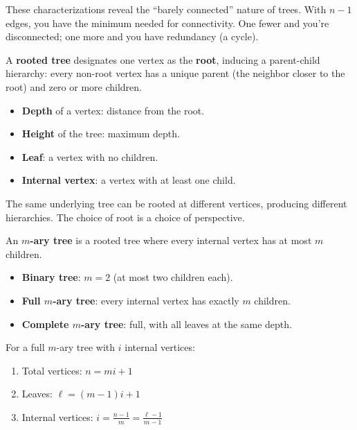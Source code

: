 These characterizations reveal the ``barely connected'' nature of trees. With $n-1$ edges, you have the minimum needed for connectivity. One fewer and you're disconnected; one more and you have redundancy (a cycle).

\begin{definition}
A \textbf{rooted tree} designates one vertex as the \textbf{root}, inducing a parent-child hierarchy: every non-root vertex has a unique parent (the neighbor closer to the root) and zero or more children.
\begin{itemize}
  \item \textbf{Depth} of a vertex: distance from the root.
  \item \textbf{Height} of the tree: maximum depth.
  \item \textbf{Leaf}: a vertex with no children.
  \item \textbf{Internal vertex}: a vertex with at least one child.
\end{itemize}
\end{definition}

The same underlying tree can be rooted at different vertices, producing different hierarchies. The choice of root is a choice of perspective.

\begin{definition}
An \textbf{$m$-ary tree} is a rooted tree where every internal vertex has at most $m$ children.
\begin{itemize}
  \item \textbf{Binary tree}: $m = 2$ (at most two children each).
  \item \textbf{Full $m$-ary tree}: every internal vertex has exactly $m$ children.
  \item \textbf{Complete $m$-ary tree}: full, with all leaves at the same depth.
\end{itemize}
\end{definition}

\begin{theorem}
For a full $m$-ary tree with $i$ internal vertices:
\begin{enumerate}
  \item Total vertices: $n = mi + 1$
  \item Leaves: $\ell = (m-1)i + 1$
  \item Internal vertices: $i = \frac{n-1}{m} = \frac{\ell - 1}{m - 1}$
\end{enumerate}
\end{theorem}

